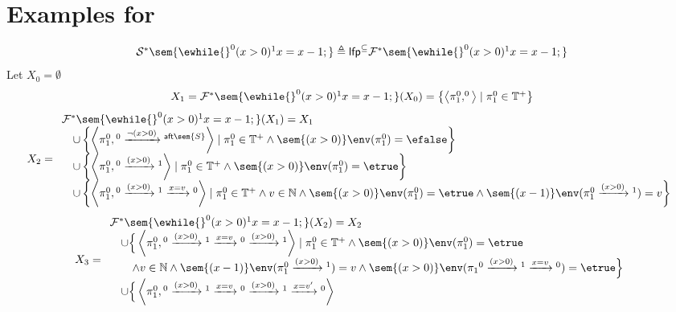 \section{Examples for \cite{cousot2019abstract}}
\begin{example}
\[
 \begin{array}{l}
 \mathcal{S}^{*}\sem{
 \ewhile {}^0 (x > 0) {}^1 x = x - 1;
 } \triangleq \mathsf{lfp}^\subseteq\mathcal{F}^*\sem{\ewhile {}^0 (x > 0) {}^1 x = x - 1;}
  \end{array}
 \]
 Let $X_0 =  \emptyset$
 \[
 \begin{array}{l}
X_1 = 
\mathcal{F}^*\sem{\ewhile {}^0 (x > 0) {}^1 x = x - 1;}(X_0) = \left\{ \left< \pi_1^0, ^0\right> \mid \pi_1^0 \in \mathbb{T^{+}} \right\}
  \end{array}
 \]
 \[
 X_2 = \begin{array}{l}
 \mathcal{F}^*\sem{\ewhile {}^0 (x > 0) {}^1 x = x - 1;}(X_1) = X_1
  \\
 \quad \cup \left\{ \left< \pi_1^0, {}^0 \xrightarrow{\neg(x > 0)} {}^{\mathsf{aft}\sem{S}} \right> 
 \mid \pi_1^0 \in \mathbb{T^{+}} \land 
 \sem{(x > 0)}\env(\pi_1^0) = \efalse \right\}
\\
 \quad \cup \left\{ \left< \pi_1^0, {}^0 \xrightarrow{(x > 0)} {}^1 \right> 
 \mid \pi_1^0 \in \mathbb{T^{+}} \land 
 \sem{(x > 0)}\env(\pi_1^0) = \etrue \right\}
 \\
 \quad \cup \left\{ \left< \pi_1^0, {}^0 \xrightarrow{(x > 0)} {}^1 \xrightarrow{x = v} {}^0 \right> 
 \mid \pi_1^0 \in \mathbb{T^{+}} \land 
 v \in \mathbb{N} \land
 \sem{(x > 0)}\env(\pi_1^0) = \etrue  \land
 \sem{(x - 1)}\env(\pi_1^0 \xrightarrow{(x > 0)} {}^1) = v \right\}
 \end{array}
 \]
  \[
 X_3 = \begin{array}{l}
 \mathcal{F}^*\sem{\ewhile {}^0 (x > 0) {}^1 x = x - 1;}(X_2) = X_2
  \\
  \quad \cup \Big\{ \left< \pi_1^0, {}^0 \xrightarrow{(x > 0)} {}^1 \xrightarrow{x = v} {}^0 \xrightarrow{(x > 0)} {}^1 \right> 
 \mid \pi_1^0 \in \mathbb{T^{+}} \land 
 \sem{(x > 0)}\env(\pi_1^0) = \etrue  
 \\ \qquad \land
 v \in \mathbb{N} \land
 \sem{(x - 1)}\env(\pi_1^0 \xrightarrow{(x > 0)} {}^1) = v
 \land 
 \sem{(x > 0)}\env(\pi_1{}^0 \xrightarrow{(x > 0)} {}^1 \xrightarrow{x = v} {}^0) = \etrue  \Big\}
  \\
	\quad \cup \Big\{ \left< \pi_1^0, {}^0 \xrightarrow{(x > 0)} {}^1 \xrightarrow{x = v} {}^0 \xrightarrow{(x > 0)} {}^1 \xrightarrow{x = v'} {}^0 \right> 

\end{array}\]
\end{example}
